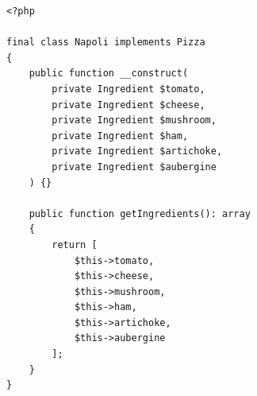 \begin{frame}[fragile,c]
    \begin{lstlisting}
<?php

final class Napoli implements Pizza
{
    public function __construct(
        private Ingredient $tomato,
        private Ingredient $cheese,
        private Ingredient $mushroom,
        private Ingredient $ham,
        private Ingredient $artichoke,
        private Ingredient $aubergine
    ) {}

    public function getIngredients(): array
    {
        return [
            $this->tomato,
            $this->cheese,
            $this->mushroom,
            $this->ham,
            $this->artichoke,
            $this->aubergine
        ];
    }
}
    \end{lstlisting}
\end{frame}

